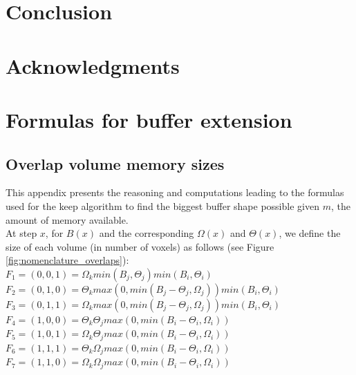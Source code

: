 \documentclass[conference]{IEEEtran}
\begin{document}
\section*{Conclusion}

\section*{Acknowledgments}




\appendices

  \section{Formulas for buffer extension}
  \label{FormulasKeep}

  \subsection{Overlap volume memory sizes}
  This appendix presents the reasoning and computations leading to the formulas used for the keep algorithm to find the biggest buffer shape possible given $m$, the amount of memory available. \\

  At step $x$, for $B(x)$ and the corresponding $\Omega(x)$ and $\Theta(x)$, we define the size of each volume (in number of voxels) as follows (see Figure \ref{fig:nomenclature_overlaps}): \\
  $F_1 = (0,0,1) = \Omega_k min(B_j, \Theta_j) min(B_i, \Theta_i)$ \\
  $F_2 = (0,1,0) = \Theta_k max(0, min(B_j - \Theta_j, \Omega_j)) min(B_i, \Theta_i)$ \\
  $F_3 = (0,1,1) = \Omega_k max(0, min(B_j - \Theta_j, \Omega_j)) min(B_i, \Theta_i)$ \\
  $F_4 = (1,0,0) = \Theta_k \Theta_j max(0, min(B_i-\Theta_i, \Omega_i))$ \\
  $F_5 = (1,0,1) = \Omega_k \Theta_j max(0, min(B_i-\Theta_i, \Omega_i))$ \\
  $F_6 = (1,1,1) = \Theta_k \Omega_j max(0, min(B_i-\Theta_i, \Omega_i))$ \\
  $F_7 = (1,1,0) = \Omega_k \Omega_j max(0, min(B_i-\Theta_i, \Omega_i))$ \\
\end{document}
